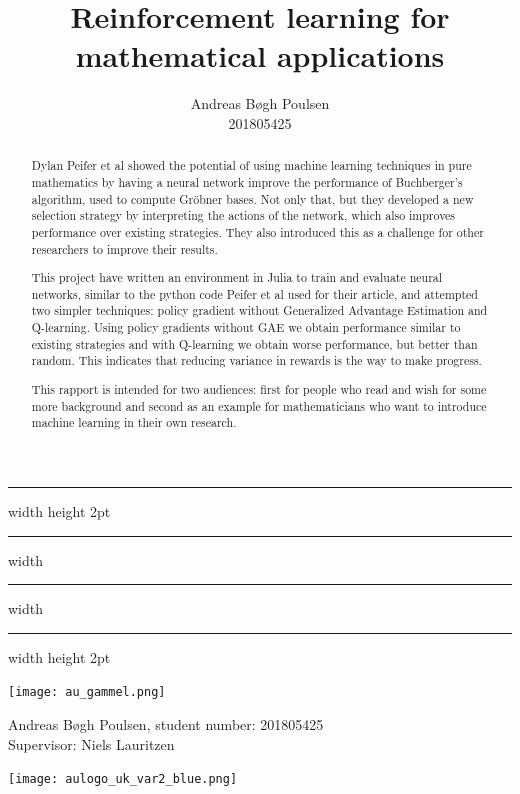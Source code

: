 \documentclass{article}
\title{Reinforcement learning for mathematical applications}
\author{
    Andreas Bøgh Poulsen\\
    201805425
}
\theoremstyle{changedot}
\theoremstyle{changedotbreak}
\theoremstyle{nonumberplain}
\begin{document}
\begin{titlepage}
  \center \sc
  \hrule width \hsize height 2pt \kern 1mm \hrule width \hsize
  \vspace{4mm}
  \vspace{6mm}
  \hrule width \hsize \kern 1mm \hrule width \hsize height 2pt
  \vspace{10mm}

  \vspace{10mm}

  \texttt{[image: au\_gammel.png]}

  \vspace{15mm}

  {\large Andreas Bøgh Poulsen, student number: 201805425 \\ Supervisor: Niels Lauritzen}

  \vspace{7mm}

  \texttt{[image: aulogo\_uk\_var2\_blue.png]}
\end{titlepage}

\begin{abstract}
  Dylan Peifer et al \cite{peifer} showed the potential of using machine learning techniques in pure mathematics by having a neural network improve the performance of Buchberger's algorithm, used to compute Gröbner bases. Not only that, but they developed a new selection strategy by interpreting the actions of the network, which also improves performance over existing strategies. They also introduced this as a challenge for other researchers to improve their results.

  This project have written an environment in Julia to train and evaluate neural networks, similar to the python code Peifer et al used for their article, and attempted two simpler techniques: policy gradient without Generalized Advantage Estimation and Q-learning. Using policy gradients without GAE we obtain performance similar to existing strategies and with Q-learning we obtain worse performance, but better than random. This indicates that reducing variance in rewards is the way to make progress.

  This rapport is intended for two audiences: first for people who read \cite{peifer} and wish for some more background and second as an example for mathematicians who want to introduce machine learning in their own research.
\end{abstract}
\end{document}
